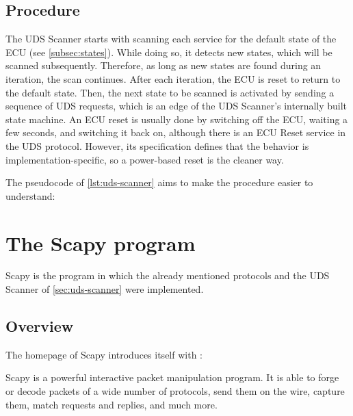 \subsection{Procedure}

The UDS Scanner starts with scanning each service for the default state of the ECU (see \autoref{subsec:states}). While doing so, it detects new states, which will be scanned subsequently. Therefore, as long as new states are found during an iteration, the scan continues. After each iteration, the ECU is reset to return to the default state. Then, the next state to be scanned is activated by sending a sequence of UDS requests, which is an edge of the UDS Scanner's internally built state machine. An ECU reset is usually done by switching off the ECU, waiting a few seconds, and switching it back on, although there is an ECU Reset service in the UDS protocol. However, its specification defines that the behavior is implementation-specific, so a power-based reset is the cleaner way.

The pseudocode of \autoref{lst:uds-scanner} aims to make the procedure easier to understand:




\section{The Scapy program}
\label{sec:scapy}

Scapy is the program in which the already mentioned protocols and the UDS Scanner of \autoref{sec:uds-scanner} were implemented.

\subsection{Overview}
The homepage of Scapy introduces itself with \cite{scapy}:
\begin{displayquote}
Scapy is a powerful interactive packet manipulation program. It is able to forge or decode packets of a wide number of protocols, send them on the wire, capture them, match requests and replies, and much more.
\end{displayquote}

